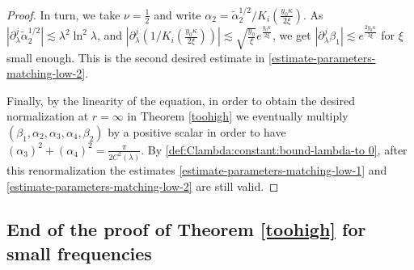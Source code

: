 \documentclass[11 pt]{amsart}
\theoremstyle{definition}
\theoremstyle{remark}
\numberwithin{equation}{section}
\begin{document}
\begin{proof}
In turn, we take $\nu=\frac 12$ and write $\alpha_2=\widetilde \alpha^{1/2}_2/K_i \left( \frac{y_0\kappa}{2\xi} \right)$. As $|\partial_\lambda^j \widetilde \alpha_2^{1/2}|\lesssim \lambda^2\ln^2\lambda$, and $|\partial_\lambda^j (1/K_i \left(\frac{y_0\kappa}{2\xi} \right))|\lesssim \sqrt{\frac{y_0}{\xi}}e^{\frac{y_0\kappa}{2\xi}}$, we get $|\partial_\lambda^j \beta_1|\lesssim  e^{\frac{2y_0\kappa}{3\xi}}$ for $\xi $ small enough. This is the second desired estimate in \eqref{estimate-parameters-matching-low-2}.

Finally, by the linearity of the equation, in order to obtain the desired normalization at $r=\infty$ in Theorem \ref{toohigh} we eventually multiply $(\beta_1, \alpha_2,\alpha_3,\alpha_4,\beta_2)$ by a positive scalar in order to have $(\alpha_3)^2+(\alpha_4)^2=\frac{\pi}{2C^2(\lambda)}$. By \eqref{def:Clambda:constant:bound-lambda-to 0}, after this renormalization the estimates \eqref{estimate-parameters-matching-low-1} and \eqref{estimate-parameters-matching-low-2} are still valid.

\end{proof}


\subsection{End of the proof of Theorem \ref{toohigh} for small frequencies}
\end{document}
